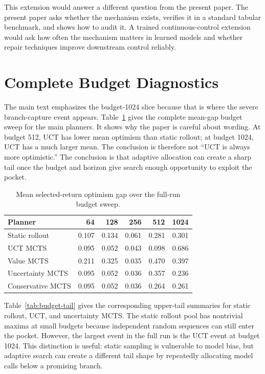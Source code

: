 \documentclass{article}
\begin{document}
This extension would answer a different question from the present paper. The present paper asks whether the mechanism exists, verifies it in a standard tabular benchmark, and shows how to audit it. A trained continuous-control extension would ask how often the mechanism matters in learned models and whether repair techniques improve downstream control reliably.

\section{Complete Budget Diagnostics}

The main text emphasizes the budget-1024 slice because that is where the severe branch-capture event appears. Table~\ref{tab:budget-mean} gives the complete mean-gap budget sweep for the main planners. It shows why the paper is careful about wording. At budget 512, UCT has lower mean optimism than static rollout; at budget 1024, UCT has a much larger mean. The conclusion is therefore not ``UCT is always more optimistic.'' The conclusion is that adaptive allocation can create a sharp tail once the budget and horizon give search enough opportunity to exploit the pocket.

\begin{table}[htbp]
\caption{Mean selected-return optimism gap over the full-run budget sweep.}
\label{tab:budget-mean}
\begin{center}
\small
\begin{tabular}{lrrrrr}
\toprule
Planner & 64 & 128 & 256 & 512 & 1024 \\
\midrule
Static rollout & 0.107 & 0.134 & 0.061 & 0.281 & 0.301 \\
UCT MCTS & 0.095 & 0.052 & 0.043 & 0.098 & 0.686 \\
Value MCTS & 0.211 & 0.325 & 0.035 & 0.470 & 0.397 \\
Uncertainty MCTS & 0.095 & 0.052 & 0.036 & 0.357 & 0.236 \\
Conservative MCTS & 0.095 & 0.052 & 0.036 & 0.264 & 0.261 \\
\bottomrule
\end{tabular}
\end{center}
\end{table}

Table~\ref{tab:budget-tail} gives the corresponding upper-tail summaries for static rollout, UCT, and uncertainty MCTS. The static rollout pool has nontrivial maxima at small budgets because independent random sequences can still enter the pocket. However, the largest event in the full run is the UCT event at budget 1024. This distinction is useful: static sampling is vulnerable to model bias, but adaptive search can create a different tail shape by repeatedly allocating model calls below a promising branch.
\end{document}
